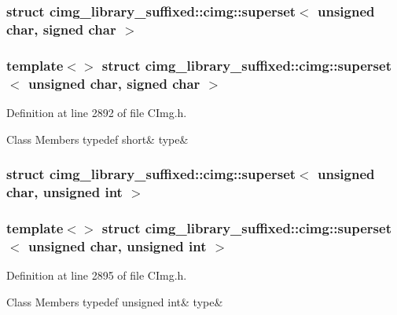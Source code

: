 \subsubsection{struct cimg\+\_\+library\+\_\+suffixed\+:\+:cimg\+:\+:superset$<$ unsigned char, signed char $>$}
\subsubsection*{template$<$$>$\newline
struct cimg\+\_\+library\+\_\+suffixed\+::cimg\+::superset$<$ unsigned char, signed char $>$}



Definition at line 2892 of file C\+Img.\+h.

\begin{DoxyFields}{Class Members}
\mbox{\label{namespacecimg__library__suffixed_1_1cimg_a9f434661bf301c7225643caac5757d33}} 
typedef short&
type&
\\
\hline

\end{DoxyFields}
\label{structcimg__library__suffixed_1_1cimg_1_1superset_3_01unsigned_01char_00_01unsigned_01int_01_4}
\subsubsection{struct cimg\+\_\+library\+\_\+suffixed\+:\+:cimg\+:\+:superset$<$ unsigned char, unsigned int $>$}
\subsubsection*{template$<$$>$\newline
struct cimg\+\_\+library\+\_\+suffixed\+::cimg\+::superset$<$ unsigned char, unsigned int $>$}



Definition at line 2895 of file C\+Img.\+h.

\begin{DoxyFields}{Class Members}
\mbox{\label{namespacecimg__library__suffixed_1_1cimg_ad07e13e16e27434e1427857ebb7104dd}} 
typedef unsigned int&
type&
\\
\hline

\end{DoxyFields}
\label{structcimg__library__suffixed_1_1cimg_1_1superset_3_01unsigned_01char_00_01unsigned_01short_01_4}
